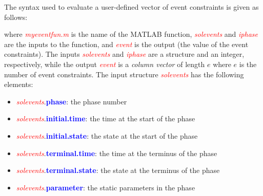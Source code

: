 \documentclass[10pt]{article}
\newcommand{\bfblue}[1]{\textcolor{blue}{\bf #1}}
\newcommand{\slred}[1]{\textcolor{red}{\sl #1}}
\begin{document}
The syntax used to evaluate a user-defined vector of event constraints
is given as follows:
\begin{center}
\end{center}
{\noindent}where \slred{myeventfun.m} is the name of the MATLAB function,
\slred{solevents} and \slred{iphase} are the inputs to the function, and
\slred{event} is the output (\ie the value of the event constraints).
The inputs \slred{solevents} and \slred{iphase} are a structure and
an integer, respectively, while the output \slred{event} is a
{\em column vector} of length $e$ where $e$ is the number of event
constraints.  The input structure \slred{solevents} has the following elements:
\begin{itemize}
  \item \slred{solevents}.\bfblue{phase}:  the phase number
  \item \slred{solevents}.\bfblue{initial.time}:  the time at the start of the phase
  \item \slred{solevents}.\bfblue{initial.state}:  the state at the start of the phase
  \item \slred{solevents}.\bfblue{terminal.time}:  the time at the terminus of the phase
  \item \slred{solevents}.\bfblue{terminal.state}:  the state at the terminus of the phase
  \item \slred{solevents}.\bfblue{parameter}:  the static parameters in the phase
\end{itemize}
\end{document}
